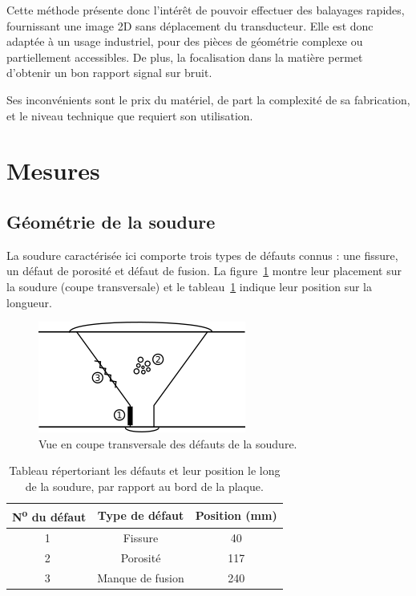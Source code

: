 \documentclass[twoside]{article}
\begin{document}
\begin{multicols}{2}
Cette méthode présente donc l'intérêt de pouvoir effectuer des balayages rapides, fournissant une image 2D sans déplacement du transducteur. Elle est donc adaptée à un usage industriel, pour des pièces de géométrie complexe ou partiellement accessibles. De plus, la focalisation dans la matière permet d'obtenir un bon rapport signal sur bruit.

Ses inconvénients sont le prix du matériel, de part la complexité de sa fabrication, et le niveau technique que requiert son utilisation. 


\section{Mesures}

\subsection{Géométrie de la soudure}

La soudure caractérisée ici comporte trois types de défauts connus : une fissure, un défaut de porosité et défaut de fusion. La figure~\ref{soudure} montre leur placement sur la soudure (coupe transversale) et le tableau~\ref{position} indique leur position sur la longueur.

\begin{figure}[H]
	\centering
	\includegraphics[scale=0.9]{images/soudure.png}
	\caption{\label{soudure}Vue en coupe transversale des défauts de la soudure.}
\end{figure}

\begin{table}[H]
	\centering
	\begin{tabular}{c | c | c}
		N\textsuperscript{o} du défaut & Type de défaut & Position (mm) \\\hline
		\textcircled{\footnotesize 1} & Fissure & 40 \\ \hline
		\textcircled{\footnotesize 2} & Porosité & 117 \\ \hline
		\textcircled{\footnotesize 3} & Manque de fusion & 240 \\ 
	\end{tabular}	
	\caption{\label{position}Tableau répertoriant les défauts et leur position le long de la soudure, par rapport au bord de la plaque.}
\end{table}


\end{multicols}
\end{document}
